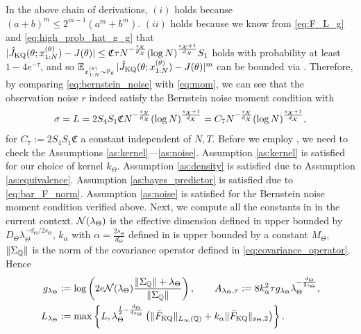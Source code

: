 In the above chain of derivations, $(i)$ holds because $(a+ b)^m \leq 2^{m-1}(a^m + b^m)$. $(ii)$ holds because we know from \eqref{eq:F_L_g} and \eqref{eq:high_prob_hat_g_g} that $| \hat{J}_{\text{KQ}}(\theta; x_{1:N}^{(\theta)}) - J(\theta) | \leq \mathfrak{C} \tau N^{-\frac{s_{\mathcal{X}}}{d_{\mathcal{X}}}} (\log N)^{\frac{s_{\mathcal{X}}+1}{d_{\mathcal{X}}}} S_1$ holds with probability at least $1 - 4 e^{-\tau}$, and so $\operatorname{\mathbb{E}}_{x_{1:N}^{(\theta)} \sim \mathbb{P}_{\theta}} | \hat{J}_{\text{KQ}}(\theta; x_{1:N}^{(\theta)}) - J(\theta)|^m$ can be bounded via . Therefore, by comparing \eqref{eq:bernstein_noise} with \eqref{eq:mom}, we can see that the observation noise $r$ indeed satisfy the Bernstein noise moment condition with 
\begin{align*}
    \sigma = L = 2 S_4 S_1 \mathfrak{C} N^{-\frac{s_{\mathcal{X}}}{d_{\mathcal{X}}}}(\log N)^{\frac{s_{\mathcal{X}}+1}{d_{\mathcal{X}}}} = C_7 N^{-\frac{s_{\mathcal{X}}}{d_{\mathcal{X}}}} (\log N)^{\frac{s_{\mathcal{X}}+1}{d_{\mathcal{X}}}},
\end{align*} 
for $C_7 := 2 S_4 S_1 \mathfrak{C}$ a constant independent of $N,T$.
Before we employ , we need to check the Assumptions \ref{as:kernel}---\ref{as:noise}. Assumption \ref{as:kernel} is satisfied for our choice of kernel $k_\Theta$. Assumption \ref{as:density} is satisfied due to Assumption \ref{as:equivalence}. 
Assumption \ref{as:bayes_predictor} is satisfied due to \eqref{eq:bar_F_norm}. Assumption \ref{as:noise} is satisfied for the Bernstein noise moment condition verified above.
Next, we compute all the constants in  in the current context. 
$\mathcal{N}(\lambda_\Theta)$ is the effective dimension defined in  upper bounded by $D_\Theta \lambda_\Theta^{- d_\Theta / 2s_\Theta}$, $k_{\alpha}$ with $\alpha = \frac{2s_\Theta}{d_\Theta}$ defined in  is upper bounded by a constant $M_\Theta$, 
$\| \Sigma_{\mathbb{Q}}\|$ is the norm of the covariance operator defined in \eqref{eq:covariance_operator}.  Hence 
\begin{align*}
    g_{\lambda_\Theta} &:=\log \left(2 e \mathcal{N}(\lambda_\Theta) \frac{ \| \Sigma_{\mathbb{Q}}\| + \lambda_\Theta }{ \| \Sigma_{\mathbb{Q}}\| } \right), \qquad A_{\lambda_\Theta, \tau} := 8 k_{\alpha}^2 \tau g_{\lambda_\Theta} \lambda_\Theta^{-\frac{d_\Theta}{2s_\Theta} },  \\
    L_{\lambda_\Theta} &:= \max \left \{ L, \lambda_\Theta^{\frac{1}{2} - \frac{d_\Theta}{4s_\Theta} } \left( \| \bar{F}_{\text{KQ}} \|_{L_\infty(\mathbb{Q})} + k_{\alpha} \| \bar{F}_{\text{KQ}} \|_{s_\Theta, 2} \right) \right\} .
\end{align*}
